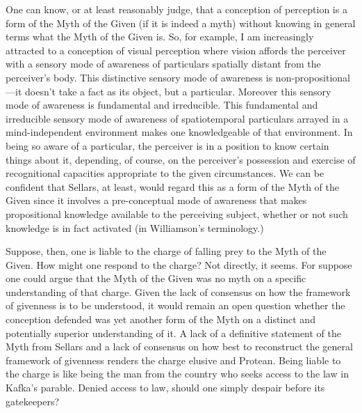 \documentclass[12pt]{article}
\begin{document}
One can know, or at least reasonably judge, that a conception of perception is a form of the Myth of the Given (if it is indeed a myth) without knowing in general terms what the Myth of the Given is. So, for example, I am increasingly attracted to a conception of visual perception where vision affords the perceiver with a sensory mode of awareness of particulars spatially distant from the perceiver's body. This distinctive sensory mode of awareness is non-propositional---\-it doesn't take a fact as its object, but a particular. Moreover this sensory mode of awareness is fundamental and irreducible. This fundamental and irreducible sensory mode of awareness of spatiotemporal particulars arrayed in a mind-independent environment makes one knowledgeable of that environment. In being so aware of a particular, the perceiver is in a position to know certain things about it, depending, of course, on the perceiver's possession and exercise of recognitional capacities appropriate to the given circumstances. We can be confident that Sellars, at least, would regard this as a form of the Myth of the Given since it involves a pre-conceptual mode of awareness that makes propositional knowledge available to the perceiving subject, whether or not such knowledge is in fact activated (in Williamson's \citeyear{Williamson:1990uq} terminology.) 

Suppose, then, one is liable to the charge of falling prey to the Myth of the Given. How might one respond to the charge? Not directly, it seems. For suppose one could argue that the Myth of the Given was no myth on a specific understanding of that charge. Given the lack of consensus on how the framework of givenness is to be understood, it would remain an open question whether the conception defended was yet another form of the Myth on a distinct and potentially superior understanding of it. A lack of a definitive statement of the Myth from Sellars and a lack of consensus on how best to reconstruct the general framework of givenness renders the charge elusive and Protean. Being liable to the charge is like being the man from the country who seeks access to the law in Kafka's parable. Denied access to law, should one simply despair before its gatekeepers?
\end{document}
